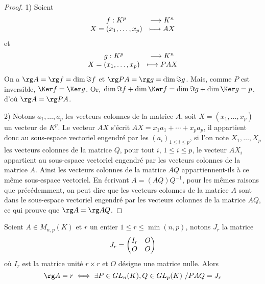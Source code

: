 \documentclass[class=report,crop=false]{standalone}
\begin{document}
\begin{proof}
1) Soient $$\begin{array}{cc}f:K^p&\longrightarrow K^n\cr X=(x_1,\dots,x_p)&\longmapsto AX\end{array}$$ et 
$$\begin{array}{cc}g:K^p&\longrightarrow K^n\cr X=(x_1,\dots,x_p)&\longmapsto PAX\end{array}$$
On a $\rg A=\rg f=\dim\Im f$ et $\rg PA=\rg g=\dim\Im g$. Mais, comme $P$ est inversible, $\Ker f=\Ker g$. Or, $\dim \Im f+\dim\Ker f=\dim\Im g +\dim\Ker g=p$, d'où $\rg A=\rg PA$.


2) Notons $a_1,\dots,a_p$ les vecteurs colonnes de la matrice $A$, soit $X=(x_1,\dots,x_p)$ un vecteur de $K^p$. Le vecteur $AX$ s'écrit $AX=x_1a_1+\cdots+x_pa_p$, il appartient donc au sous-espace vectoriel engendré par les $(a_i)_{1\leq i\leq p}$, si l'on note $X_1,\dots,X_p$ les vecteurs colonnes de la matrice $Q$, pour tout $i$, $1\leq i\leq p$, le vecteur $AX_i$ appartient au sous-espace vectoriel engendré par les vecteurs colonnes de la matrice $A$. Ainsi les vecteurs colonnes de la matrice $AQ$ appartiennent-ils à ce même sous-espace vectoriel. En écrivant $A=(AQ)Q^{-1}$, pour les mêmes raisons que précédemment, on peut dire que les vecteurs colonnes de la matrice $A$ sont dans le sous-espace vectoriel engendré par les vecteurs colonnes de la matrice $AQ$, ce qui prouve que $\rg A=\rg AQ$.

\end{proof}



\begin{theoreme}
Soient $A\in M_{n,p}(K)$ et $r$ un entier $1\leq r\leq \min(n,p)$, notons $J_r$ la matrice
$$J_r=\left(\begin{matrix}I_r &O\cr O & O\end{matrix}\right)$$ où $I_r$ est la matrice unité $r\times r$ et $O$ désigne une
matrice nulle. Alors
$$\rg A= r\iff \exists P\in GL_n(K), Q\in GL_p(K)\ / PAQ=J_r$$
\end{theoreme} 
\end{document}
